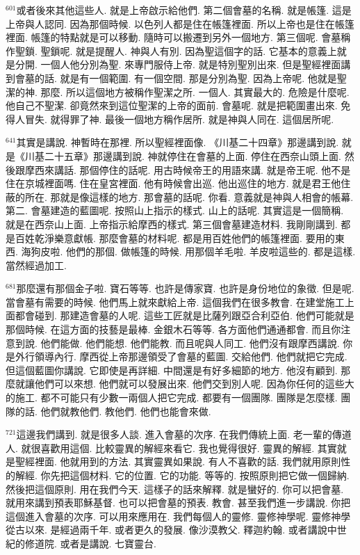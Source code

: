 \documentclass{book}
\begin{document}
$^{601}$或者後來其他這些人.
就是上帝啟示給他們.
第二個會墓的名稱.
就是帳篷.
這是上帝與人認同.
因為那個時候.
以色列人都是住在帳篷裡面.
所以上帝也是住在帳篷裡面.
帳篷的特點就是可以移動.
隨時可以搬遷到另外一個地方.
第三個呢.
會墓稱作聖鎖.
聖鎖呢.
就是提醒人.
神與人有別.
因為聖這個字的話.
它基本的意義上就是分開.
一個人他分別為聖.
來專門服侍上帝.
就是特別聖別出來.
但是聖經裡面講到會墓的話.
就是有一個範圍.
有一個空間.
那是分別為聖.
因為上帝呢.
他就是聖潔的神.
那麼.
所以這個地方被稱作聖潔之所.
一個人.
其實最大的.
危險是什麼呢.
他自己不聖潔.
卻竟然來到這位聖潔的上帝的面前.
會墓呢.
就是把範圍畫出來.
免得人冒失.
就得罪了神.
最後一個地方稱作居所.
就是神與人同在.
這個居所呢.

$^{641}$其實是講說.
神暫時在那裡.
所以聖經裡面像.
《川基二十四章》那邊講到說.
就是《川基二十五章》那邊講到說.
神就停住在會墓的上面.
停住在西奈山頭上面.
然後跟摩西來講話.
那個停住的話呢.
用古時候帝王的用語來講.
就是帝王呢.
他不是住在京城裡面嗎.
住在皇宮裡面.
他有時候會出巡.
他出巡住的地方.
就是君王他住蔽的所在.
那就是像這樣的地方.
那會墓的話呢.
你看.
意義就是神與人相會的帳幕.
第二.
會墓建造的藍圖呢.
按照山上指示的樣式.
山上的話呢.
其實這是一個簡稱.
就是在西奈山上面.
上帝指示給摩西的樣式.
第三個會墓建造材料.
我剛剛講到.
都是百姓乾淨樂意獻帳.
那麼會墓的材料呢.
都是用百姓他們的帳篷裡面.
要用的東西.
海狗皮啦.
他們的那個.
做帳篷的時候.
用那個羊毛啦.
羊皮啦這些的.
都是這樣.
當然經過加工.

$^{681}$那麼還有那個金子啦.
寶石等等.
也許是傳家寶.
也許是身份地位的象徵.
但是呢.
當會墓有需要的時候.
他們馬上就來獻給上帝.
這個我們在很多教會.
在建堂施工上面都會碰到.
那建造會墓的人呢.
這些工匠就是比薩列跟亞合利亞伯.
他們可能就是那個時候.
在這方面的技藝是最棒.
金銀木石等等.
各方面他們通通都會.
而且你注意到說.
他們能做.
他們能想.
他們能教.
而且呢與人同工.
他們沒有跟摩西講說.
你是外行領導內行.
摩西從上帝那邊領受了會墓的藍圖.
交給他們.
他們就把它完成.
但這個藍圖你講說.
它即使是再詳細.
中間還是有好多細節的地方.
他沒有顧到.
那麼就讓他們可以來想.
他們就可以發展出來.
他們交到別人呢.
因為你任何的這些大的施工.
都不可能只有少數一兩個人把它完成.
都要有一個團隊.
團隊是怎麼樣.
團隊的話.
他們就教他們.
教他們.
他們也能會來做.

$^{721}$這邊我們講到.
就是很多人談.
進入會墓的次序.
在我們傳統上面.
老一輩的傳道人.
就很喜歡用這個.
比較靈異的解經來看它.
我也覺得很好.
靈異的解經.
其實就是聖經裡面.
他就用到的方法.
其實靈異如果說.
有人不喜歡的話.
我們就用原則性的解經.
你先把這個材料.
它的位置.
它的功能.
等等的.
按照原則把它做一個歸納.
然後把這個原則.
用在我們今天.
這樣子的話來解釋.
就是蠻好的.
你可以把會墓.
就用來講到預表耶穌基督.
也可以把會墓的預表.
教會.
甚至我們進一步講說.
你把這個進入會墓的次序.
可以用來應用在.
我們每個人的靈修.
靈修神學呢.
靈修神學從古以來.
是經過兩千年.
或者更久的發展.
像沙漠教父.
釋迦約翰.
或者講說中世紀的修道院.
或者是講說.
七寶靈台.
\end{document}

